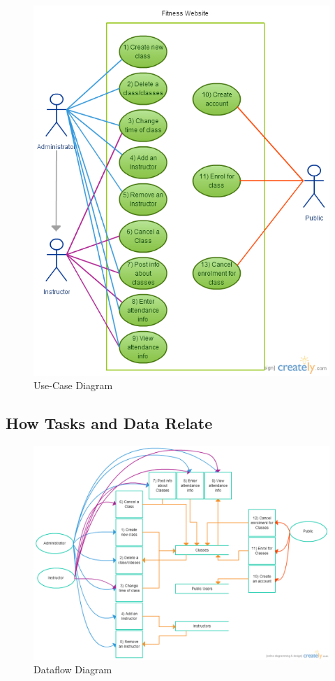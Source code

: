 \documentclass[11pt, article]{article}
\begin{document}
	\begin{figure}[ht!]
	\includegraphics[scale=0.7]{images/Usecase}
 	\caption{Use-Case Diagram}
	\end{figure}
	
	\newpage
	
	\subsection{How Tasks and Data Relate}
	
		\begin{figure}[ht!]
	\includegraphics[scale=0.4]{images/Dataflow}
 	\caption{Dataflow Diagram}
	\end{figure}
	
\end{document}
